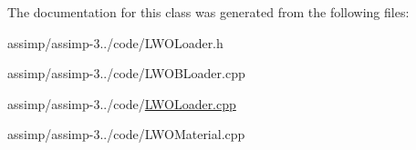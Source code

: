 The documentation for this class was generated from the following files\+:\begin{DoxyCompactItemize}
\item 
assimp/assimp-\/3../code/L\+W\+O\+Loader.\+h\item 
assimp/assimp-\/3../code/L\+W\+O\+B\+Loader.\+cpp\item 
assimp/assimp-\/3../code/\hyperlink{_l_w_o_loader_8cpp}{L\+W\+O\+Loader.\+cpp}\item 
assimp/assimp-\/3../code/L\+W\+O\+Material.\+cpp\end{DoxyCompactItemize}
